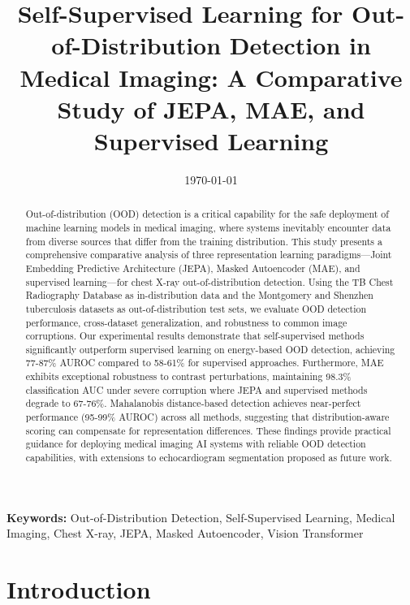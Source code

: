\documentclass[11pt,a4paper]{article}
\title{
\textbf{Self-Supervised Learning for Out-of-Distribution Detection in Medical Imaging: A Comparative Study of JEPA, MAE, and Supervised Learning}
}
\author{
}
\date{\today}
\begin{document}
\maketitle

\begin{abstract}
Out-of-distribution (OOD) detection is a critical capability for the safe deployment of machine learning models in medical imaging, where systems inevitably encounter data from diverse sources that differ from the training distribution. This study presents a comprehensive comparative analysis of three representation learning paradigms---Joint Embedding Predictive Architecture (JEPA), Masked Autoencoder (MAE), and supervised learning---for chest X-ray out-of-distribution detection. Using the TB Chest Radiography Database as in-distribution data and the Montgomery and Shenzhen tuberculosis datasets as out-of-distribution test sets, we evaluate OOD detection performance, cross-dataset generalization, and robustness to common image corruptions. Our experimental results demonstrate that self-supervised methods significantly outperform supervised learning on energy-based OOD detection, achieving 77-87\% AUROC compared to 58-61\% for supervised approaches. Furthermore, MAE exhibits exceptional robustness to contrast perturbations, maintaining 98.3\% classification AUC under severe corruption where JEPA and supervised methods degrade to 67-76\%. Mahalanobis distance-based detection achieves near-perfect performance (95-99\% AUROC) across all methods, suggesting that distribution-aware scoring can compensate for representation differences. These findings provide practical guidance for deploying medical imaging AI systems with reliable OOD detection capabilities, with extensions to echocardiogram segmentation proposed as future work.
\end{abstract}

\textbf{Keywords:} Out-of-Distribution Detection, Self-Supervised Learning, Medical Imaging, Chest X-ray, JEPA, Masked Autoencoder, Vision Transformer

\section{Introduction}
\end{document}
